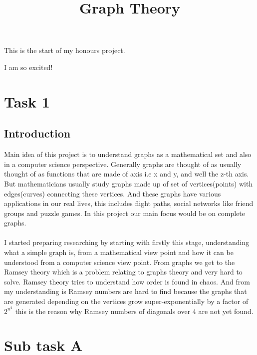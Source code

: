 \documentclass{Assignment}
\title{Graph Theory}
\begin{document}
	This is the start of my honours project. 
	
	I am so excited!\\
\section{Task 1}
\subsection*{Introduction}
Main idea of this project is to understand graphs  as a mathematical set and also in a computer science perspective. Generally graphs are thought of as usually thought of as functions that are made of axis i.e x and y, and well the z-th axis. But mathematicians usually study graphs made up of set of vertices(points) with edges(curves) connecting these vertices. And these graphs have various applications in our real lives, this includes flight paths, social networks like friend groups and puzzle games. In this project our main focus would be on complete graphs.\\
\\
 I started preparing researching by starting with firstly this stage, understanding what a simple graph is, from a mathematical view point and how it can be understood from a computer science view point. From graphs we get to the Ramsey theory which is a problem relating to graphs theory and very hard to solve. Ramsey theory tries to understand how order is found in chaos. And from my understanding is Ramsey numbers are hard to find because the graphs that are generated depending on the vertices grow super-exponentially by a factor of $2^{n^2}$ this is the reason why Ramsey numbers of diagonals over 4 are not yet found.\\
  
\section*{Sub task A}
\end{document}
